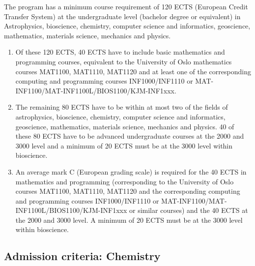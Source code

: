 \documentclass[%
oneside,                 %
final,                   %
10pt]{article}
\begin{document}
The program has a minimum course requirement of 120 ECTS (European Credit Transfer System) at the undergraduate level (bachelor degree or equivalent) in Astrophysics, bioscience, chemistry, computer science and informatics, geoscience, mathematics, materials science, mechanics and physics. 
\begin{enumerate}
\item Of these 120 ECTS, 40 ECTS have to include basic mathematics and programming courses, equivalent to the University of Oslo mathematics courses MAT1100, MAT1110, MAT1120 and at least one of the corresponding computing and programming courses INF1000/INF1110 or MAT-INF1100/MAT-INF1100L/BIOS1100/KJM-INF1xxx. 

\item The remaining 80 ECTS have to be within at most two of the fields of astrophysics, bioscience, chemistry, computer science and informatics, geoscience, mathematics, materials science, mechanics and physics. 40 of these 80 ECTS have to be advanced undergraduate courses at the 2000 and 3000 level and a minimum of 20 ECTS must be at the 3000 level within bioscience. 

\item An average mark C (European grading scale) is required for the 40 ECTS in mathematics and programming (corresponding  to the University of Oslo courses  MAT1100, MAT1110, MAT1120  and the corresponding computing and programming courses INF1000/INF1110 or MAT-INF1100/MAT-INF1100L/BIOS1100/KJM-INF1xxx or similar courses) and the 40 ECTS at the 2000 and 3000 level. A minimum of 20 ECTS must be at the 3000 level within bioscience.
\end{enumerate}

\noindent
\subsection{Admission criteria: Chemistry}
\end{document}
